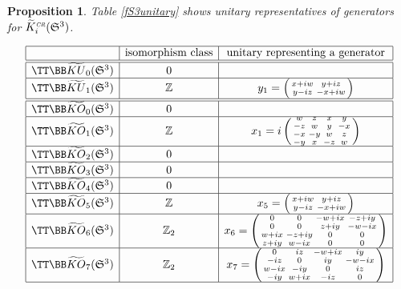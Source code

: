 \documentclass[12pt, reqno]{amsart}
\newtheorem{prop}[thm]{Proposition}
\theoremstyle{definition}
\def\Z{{\mathbb Z}}
\def\crr{^{\scriptscriptstyle {\it CR}}}
\newcommand{\fS}{\mathfrak S}
\newcommand{\sm}[4]
	{ \left( \begin{smallmatrix} {#1} & {#2} \\ {#3} & {#4} \end{smallmatrix} \right)  }
\begin{document}
\begin{prop}
Table \ref{fS3unitary} shows unitary representatives of generators for $\widetilde{K}\crr_i(\fS^3)$.
\end{prop}

\begin{table} 
\caption{Unitaries for $K\crr(\fS^3)$} \label{fS3unitary}
$$\begin{array}{|c|c|c|}  \hline
  & \text{isomorphism class} & { \text{unitary representing a generator}}  \\ \hline \hline
 \TT \BB \widetilde{KU}_0( \fS^3) & 0 &  \\ \hline
 \TT \BB \widetilde{KU}_1(\fS^3) & \Z & y_1 = \sm{x + iw}{y + iz}{y - iz}{-x + iw}     \\ \hline \hline
 \TT \BB \widetilde{KO}_{0}(\fS^3) & 0 & 			\\ \hline 
 \TT \BB\widetilde{KO}_1(\fS^3) &  \Z &   
	x_{1} =  i \left( \begin{smallmatrix} w & z & x & y \\ -z & w & y & -x \\ -x & -y & w & z \\ -y & x & -z & w \end{smallmatrix} \right)
	\\ \hline 
 \TT \BB\widetilde{KO}_2(\fS^3) & 0 &       \\ \hline
 \TT \BB\widetilde{KO}_3(\fS^3) & 0 &  \\ \hline 
 \TT \BB\widetilde{KO}_4(\fS^3) & 0 &  \\ \hline
 \TT \BB\widetilde{KO}_5(\fS^3) & \Z & 
		x_5= \sm{x + iw}{y + iz}{y - iz}{-x + iw}   \\ \hline 
 \TT \BB\widetilde{KO}_6(\fS^3) & \Z_2 & 
	x_6= 	  \left( \begin{smallmatrix} 0 & 0 & -w + ix & -z + iy \\ 0 & 0 & z + iy & -w - ix \\ w + ix & -z + iy & 0 & 0 \\ z + iy & w - ix & 0 & 0 \end{smallmatrix} \right)
			\\ \hline 
 \TT \BB\widetilde{KO}_7(\fS^3) & \Z_2 &  
	x_7 = \left( \begin{smallmatrix} 0 &  iz & -w+ix & iy \\ -iz & 0 & iy & -w-ix \\ w-ix & -iy & 0 & iz \\ -iy &w + ix & -iz & 0 \end{smallmatrix} \right)
			\\ \hline 
\end{array}$$
\end{table}
\end{document}
